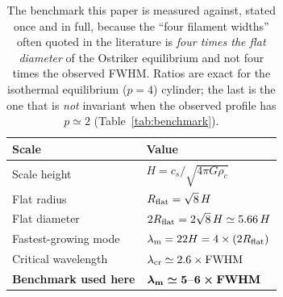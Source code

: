 \documentclass[usenatbib,twoside,twocolumn]{mnras}
\begin{document}
\begin{table}
\caption{The benchmark this paper is measured against, stated once and in full, because the ``four filament widths'' often quoted in the literature is \emph{four times the flat diameter} of the Ostriker equilibrium and not four times the observed FWHM. Ratios are exact for the isothermal equilibrium ($p=4$) cylinder; the last is the one that is \emph{not} invariant when the observed profile has $p\simeq2$ (Table~\ref{tab:benchmark}).}
\label{tab:benchmarkbox}
\footnotesize
\begin{tabular}{ll}
\toprule
Scale & Value \\
\midrule
Scale height & $H=c_s/\sqrt{4\pi G\rho_c}$ \\
Flat radius & $R_{\rm flat}=\sqrt{8}\,H$ \\
Flat diameter & $2R_{\rm flat}=2\sqrt{8}\,H\simeq5.66\,H$ \\
Fastest-growing mode & $\lambda_{\rm m}=22H=4\times(2R_{\rm flat})$ \\
Critical wavelength & $\lambda_{\rm cr}\simeq2.6\times{\rm FWHM}$ \\
\midrule
\textbf{Benchmark used here} & $\boldsymbol{\lambda_{\rm m}\simeq5}$--$\boldsymbol{6\times{\rm FWHM}}$ \\
\bottomrule
\end{tabular}
\end{table}
\end{document}
